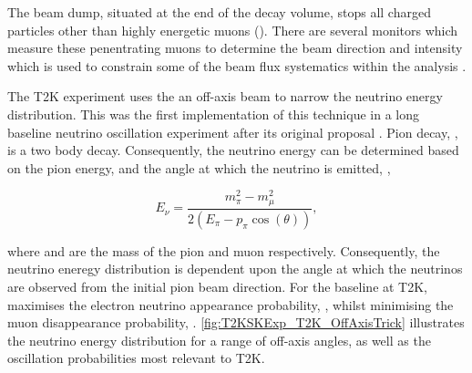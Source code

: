 The beam dump, situated at the end of the decay volume, stops all charged particles other than highly energetic muons (). There are several monitors which measure these penentrating muons to determine the beam direction and intensity which is used to constrain some of the beam flux systematics within the analysis \cite{MuMon, Vladisavljevic2020-gv}. 

The T2K experiment uses the an off-axis beam to narrow the neutrino energy distribution. This was the first implementation of this technique in a long baseline neutrino oscillation experiment after its original proposal \cite{Beavis1995-qf}. Pion decay, \quickmath{\pi \rightarrow \mu + \nu_\mu}, is a two body decay. Consequently, the neutrino energy  can be determined based on the pion energy,  and the angle at which the neutrino is emitted, \quickmath{\theta},

\begin{equation}
  E_\nu = \frac{m^{2}_{\pi} - m^{2}_{\mu}}{2\left(E_\pi - p_\pi \cos(\theta) \right)},
\end{equation}

where  and  are the mass of the pion and muon respectively. Consequently, the neutrino eneregy distribution is dependent upon the angle at which the neutrinos are observed from the initial pion beam direction. For the  baseline at T2K,  maximises the electron neutrino appearance probability, , whilst minimising the muon disappearance probability, . \autoref{fig:T2KSKExp_T2K_OffAxisTrick} illustrates the neutrino energy distribution for a range of off-axis angles, as well as the oscillation probabilities most relevant to T2K.

